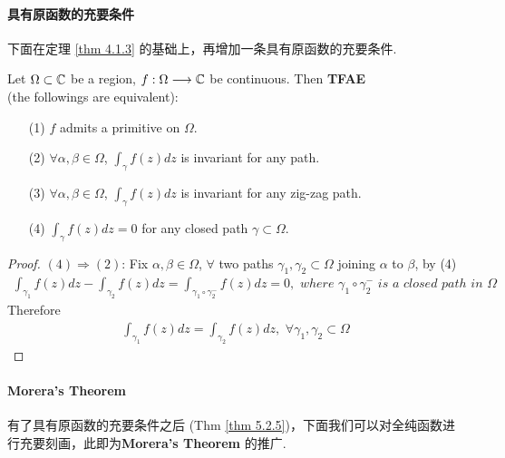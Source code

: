 \paragraph{具有原函数的充要条件}
	下面在定理 \ref{thm 4.1.3} 的基础上，再增加一条具有原函数的充要条件.
	\begin{thm}\label{thm 5.2.5}
		Let $\Omega \subset \mathbb{C}$ be a region, $f : \Omega \longrightarrow \mathbb{C}$ be continuous. Then \textbf{TFAE} \\
		(the followings are equivalent):
		\begin{enumerate}
			\item[(1)]$f$ admits a primitive on $\Omega$.
			
			\item[(2)]$\forall \alpha , \beta \in \Omega$, $\int_{\gamma}{f(z) dz}$ is invariant for any path.
			
			\item[(3)]$\forall \alpha , \beta \in \Omega$, $\int_{\gamma}{f(z) dz}$ is invariant for any zig-zag path.
			
			\item[(4)]$\int_{\gamma}{f(z) dz} = 0$ for any closed path $\gamma \subset \Omega$. 
		\end{enumerate}
	
		\vspace{2em}
		\begin{proof}
			$(4) \Rightarrow (2)$: Fix $\alpha , \beta \in \Omega$, $\forall$ two paths $\gamma_1 , \gamma_2 \subset \Omega$ joining $\alpha$ to $\beta$, by (4)
			\begin{align}
				\int_{\gamma_1}{f(z) dz} - \int_{\gamma_2}{f(z) dz} = \int_{\gamma_1 \circ \gamma_{2}^{-}}{f(z) dz} = 0 , \,\, where \,\, \gamma_1 \circ \gamma_{2}^{-} \,\, is \,\, a  \,\, closed \,\, path \,\, in \,\, \Omega
			\end{align}
			Therefore
			\begin{align}
				\int_{\gamma_1}{f(z) dz} = \int_{\gamma_2}{f(z) dz} , \,\, \forall \gamma_1 , \gamma_2 \subset \Omega
			\end{align}
		\end{proof}
	\end{thm}

\vspace{2em}
\paragraph{\textbf{Morera's Theorem}}
	有了具有原函数的充要条件之后 (Thm \ref{thm 5.2.5})，下面我们可以对全纯函数进行充要刻画，此即为\textbf{Morera's Theorem} 的推广.
	
